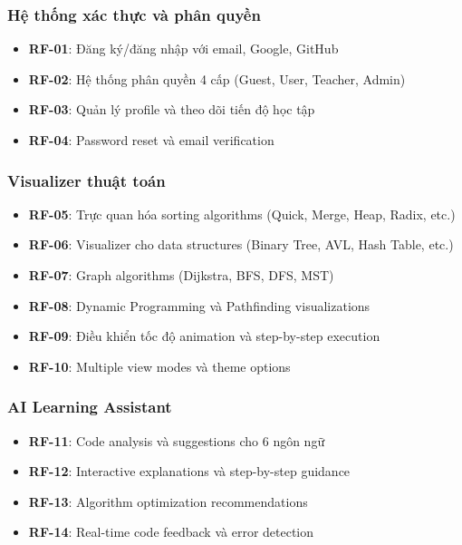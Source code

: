 \documentclass[12pt,a4paper]{article}
\begin{document}
\subsubsection{Hệ thống xác thực và phân quyền}
\begin{itemize}
    \item \textbf{RF-01}: Đăng ký/đăng nhập với email, Google, GitHub
    \item \textbf{RF-02}: Hệ thống phân quyền 4 cấp (Guest, User, Teacher, Admin)
    \item \textbf{RF-03}: Quản lý profile và theo dõi tiến độ học tập
    \item \textbf{RF-04}: Password reset và email verification
\end{itemize}

\subsubsection{Visualizer thuật toán}
\begin{itemize}
    \item \textbf{RF-05}: Trực quan hóa sorting algorithms (Quick, Merge, Heap, Radix, etc.)
    \item \textbf{RF-06}: Visualizer cho data structures (Binary Tree, AVL, Hash Table, etc.)
    \item \textbf{RF-07}: Graph algorithms (Dijkstra, BFS, DFS, MST)
    \item \textbf{RF-08}: Dynamic Programming và Pathfinding visualizations
    \item \textbf{RF-09}: Điều khiển tốc độ animation và step-by-step execution
    \item \textbf{RF-10}: Multiple view modes và theme options
\end{itemize}

\subsubsection{AI Learning Assistant}
\begin{itemize}
    \item \textbf{RF-11}: Code analysis và suggestions cho 6 ngôn ngữ
    \item \textbf{RF-12}: Interactive explanations và step-by-step guidance
    \item \textbf{RF-13}: Algorithm optimization recommendations
    \item \textbf{RF-14}: Real-time code feedback và error detection
\end{itemize}
\end{document}
